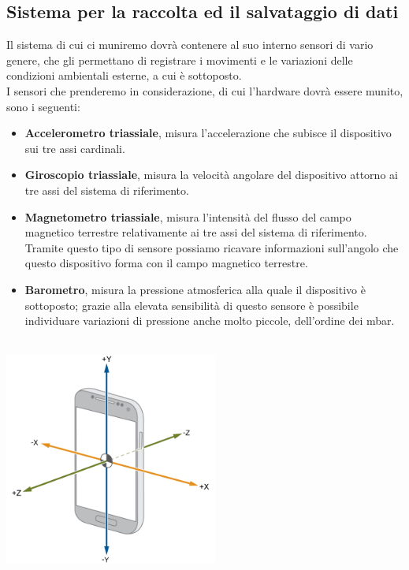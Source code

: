\documentclass[a4paper]{article}
\begin{document}
	\subsection{Sistema per la raccolta ed il salvataggio di dati}


Il sistema di cui ci muniremo dovrà contenere al suo interno sensori di vario genere, che gli permettano di registrare i movimenti e le variazioni delle condizioni ambientali esterne, a cui è sottoposto. \\
I sensori che prenderemo in considerazione, di cui l'hardware dovrà essere munito, sono i seguenti:
\begin{itemize}
\item \textbf{Accelerometro triassiale}, misura l’accelerazione che subisce il dispositivo sui tre assi cardinali.
\item \textbf{Giroscopio triassiale}, misura la velocità angolare del dispositivo attorno ai tre assi del sistema di riferimento.
\item \textbf{Magnetometro triassiale}, misura l’intensità del flusso del campo magnetico terrestre relativamente ai tre assi del sistema di riferimento. Tramite questo tipo di sensore possiamo ricavare informazioni sull’angolo che questo dispositivo forma con il campo magnetico terrestre.
\item \textbf{Barometro}, misura la pressione atmosferica alla quale il dispositivo è sottoposto; grazie alla elevata sensibilità di questo sensore è possibile individuare variazioni di pressione anche molto piccole, dell’ordine dei mbar.\\ \\
\end{itemize}

\begin{center}
\begin{minipage}{0.48\linewidth}
\includegraphics[width=70mm]{./images/triaxial_sensor.png}
\makebox[\linewidth]{}
\end{minipage}
\end{center}
\end{document}
